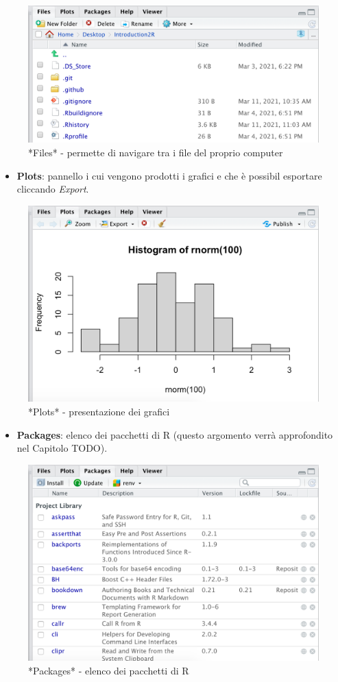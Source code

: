 \documentclass[
]{book}
\providecommand{\tightlist}{%
  \setlength{\itemsep}{0pt}\setlength{\parskip}{0pt}}
\begin{document}
\begin{figure}

{\centering \includegraphics[width=0.6\linewidth]{images/files} 

}

\caption{*Files* - permette di navigare tra i file del proprio computer}\label{fig:files}
\end{figure}

\begin{itemize}
\tightlist
\item
  \textbf{Plots}: pannello i cui vengono prodotti i grafici e che è possibil esportare cliccando \emph{Export}.
\end{itemize}

\begin{figure}

{\centering \includegraphics[width=0.6\linewidth]{images/plots} 

}

\caption{*Plots* - presentazione dei grafici}\label{fig:plots}
\end{figure}

\begin{itemize}
\tightlist
\item
  \textbf{Packages}: elenco dei pacchetti di R (questo argomento verrà approfondito nel Capitolo TODO).
\end{itemize}

\begin{figure}

{\centering \includegraphics[width=0.6\linewidth]{images/packages} 

}

\caption{*Packages* - elenco dei pacchetti di R}\label{fig:packages}
\end{figure}
\end{document}
